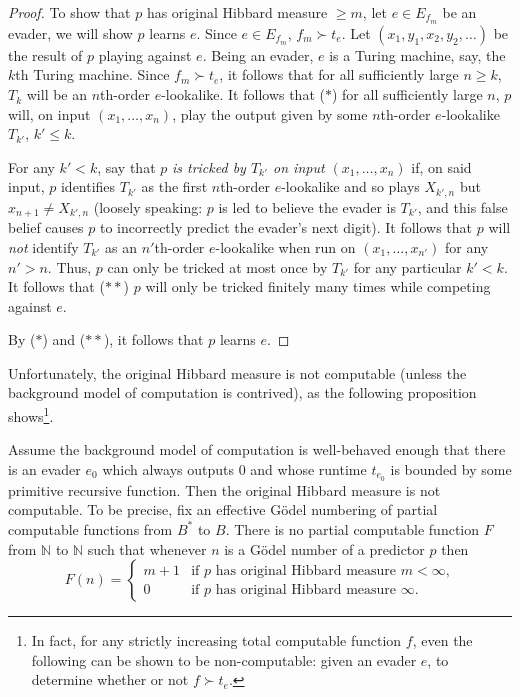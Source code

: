 \documentclass[twoside,11pt]{article}
\begin{document}
\begin{proof}
    To show that $p$ has original Hibbard measure $\geq m$,
    let $e\in E_{f_m}$ be an evader, we will show $p$ learns $e$.
    Since $e\in E_{f_m}$, $f_m\succ t_e$.
    Let $(x_1,y_1,x_2,y_2,\ldots)$ be the result of $p$ playing against $e$.
    Being an evader, $e$ is a Turing machine, say, the $k$th Turing machine.
    Since $f_m\succ t_e$, it follows that
    for all sufficiently large $n\geq k$, $T_k$ will be an $n$th-order $e$-lookalike.
    It follows that ($*$) for all sufficiently large $n$, $p$ will, on input
    $(x_1,\ldots,x_n)$, play the output given by some $n$th-order $e$-lookalike
    $T_{k'}$, $k'\leq k$.

    For any $k'<k$,
    say that $p$ \emph{is tricked by $T_{k'}$ on input $(x_1,\ldots,x_n)$}
    if, on said input, $p$ identifies $T_{k'}$ as the first
    $n$th-order $e$-lookalike and so plays $X_{k',n}$ but $x_{n+1}\not=X_{k',n}$
    (loosely speaking: $p$ is led to believe the evader is $T_{k'}$, and this
    false belief causes $p$ to incorrectly predict the evader's next digit).
    It follows that $p$ will \emph{not} identify $T_{k'}$ as an $n'$th-order
    $e$-lookalike when run on $(x_1,\ldots,x_{n'})$ for any $n'>n$.
    Thus, $p$ can only be tricked at most once by $T_{k'}$ for any particular $k'<k$.
    It follows that ($**$) $p$ will only be tricked finitely many times while competing
    against $e$.

    By ($*$) and ($**$), it follows that $p$ learns $e$.
\end{proof}

Unfortunately, the original Hibbard measure is not computable
(unless the background model of computation is contrived), as the following
proposition shows\footnote{In fact, for any strictly
increasing total computable function $f$,
even the following can be shown to be non-computable:
given an evader $e$, to determine whether or not $f\succ t_e$.}.

\begin{proposition}
\label{originalnoncomputableprop}
    Assume the background model of computation is well-behaved enough that
    there is an evader $e_0$ which always outputs $0$ and whose runtime $t_{e_0}$
    is bounded by some primitive recursive function.
    Then the original Hibbard measure is not computable. To be precise, fix an
    effective G\"odel numbering of partial computable functions
    from $B^*$ to $B$.
    There is no partial computable function $F$ from $\mathbb N$ to $\mathbb N$
    such that whenever $n$ is a G\"odel number of a predictor $p$ then
    \[
        F(n) =
        \begin{cases}
            m+1 & \mbox{if $p$ has original Hibbard measure $m<\infty$,}\\
            0 &\mbox{if $p$ has original Hibbard measure $\infty$.}
        \end{cases}
    \]
\end{proposition}
\end{document}
